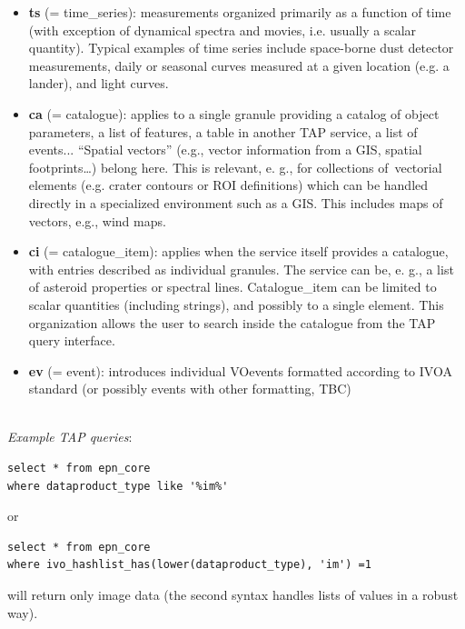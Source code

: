 \documentclass[11pt,a4paper]{ivoa}
\begin{document}
\begin{itemize}
\item \textbf{ts }(= time\_series): measurements organized primarily as a function of time (with exception of dynamical spectra and movies, i.e. usually a scalar quantity). Typical examples of time series include space-borne dust detector measurements, daily or seasonal curves measured at a given location (e.g. a lander), and light curves.
\item \textbf{ca }(= catalogue): applies to a single granule providing a catalog of object parameters, a list of features, a table in another TAP service, a list of events... ``Spatial vectors'' (e.g., vector information from a GIS, spatial footprints…) belong here. This is relevant, e. g., for collections of vectorial elements (e.g. crater contours or ROI definitions) which can be handled directly in a specialized environment such as a GIS. This includes maps of vectors, e.g., wind maps.
\item \textbf{ci }(= catalogue\_item): applies when the service itself provides a catalogue, with entries described as individual granules. The service can be, e. g., a list of asteroid properties or spectral lines. Catalogue\_item can be limited to scalar quantities (including strings), and possibly to a single element. This organization allows the user to search inside the catalogue from the TAP query interface.
\item \textbf{ev} (= event): introduces individual VOevents formatted according to IVOA standard (or possibly events with other formatting, TBC)
\end{itemize}

\\

\emph{Example TAP queries}:






\begin{verbatim}
select * from epn_core 
where dataproduct_type like '%im%'
\end{verbatim}




or 






\begin{verbatim}
select * from epn_core 
where ivo_hashlist_has(lower(dataproduct_type), 'im') =1
\end{verbatim}




will return only image data (the second syntax handles lists of values in a robust way).
\end{document}
